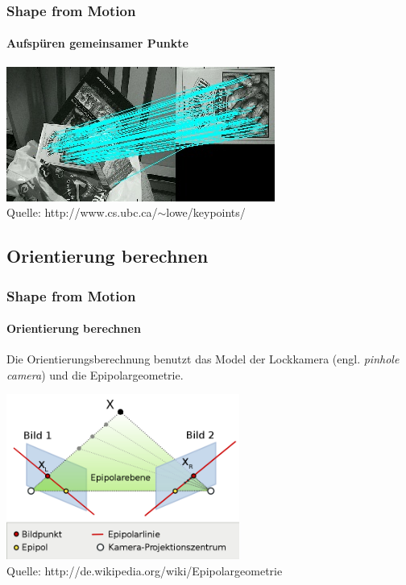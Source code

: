 \documentclass{beamer}
\begin{document}
\begin{frame}
	\frametitle{Shape from Motion}
	\framesubtitle{Aufspüren gemeinsamer Punkte}
	
	\begin{center}
		\includegraphics[width=\linewidth]{includes/sift}\\
		Quelle: http://www.cs.ubc.ca/$\sim$lowe/keypoints/
	\end{center}
\end{frame}


\subsection{Orientierung berechnen}
\begin{frame}
	\frametitle{Shape from Motion}
	\framesubtitle{Orientierung berechnen}
	
	\vspace{1em}
	Die Orientierungsberechnung benutzt das Model der Lockkamera (engl. \textit{pinhole camera}) und die Epipolargeometrie.
	
	\begin{center}
		\includegraphics[width=217pt]{includes/Epipolargeometrie3}\\
		Quelle: http://de.wikipedia.org/wiki/Epipolargeometrie
	\end{center}
\end{frame}
\end{document}
